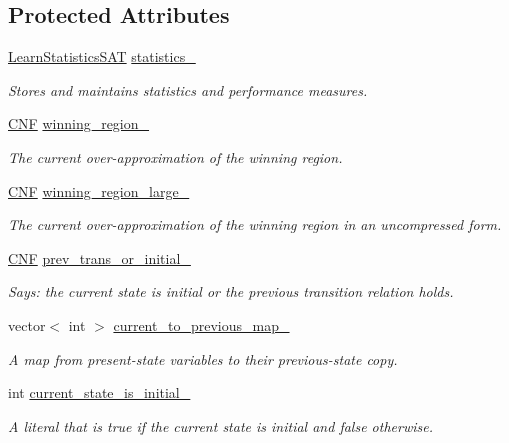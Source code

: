 \subsection*{Protected Attributes}
\begin{DoxyCompactItemize}
\item 
\hyperlink{classLearnStatisticsSAT}{Learn\-Statistics\-S\-A\-T} \hyperlink{classLearnSynthSAT_a2175c687276e00fa0fe3e158680affc1}{statistics\-\_\-}
\begin{DoxyCompactList}\small\item\em Stores and maintains statistics and performance measures. \end{DoxyCompactList}\item 
\hyperlink{classCNF}{C\-N\-F} \hyperlink{classLearnSynthSAT_aced2bce789c7a93ed4b5391dd0690616}{winning\-\_\-region\-\_\-}
\begin{DoxyCompactList}\small\item\em The current over-\/approximation of the winning region. \end{DoxyCompactList}\item 
\hyperlink{classCNF}{C\-N\-F} \hyperlink{classLearnSynthSAT_aaa79e8772e9ce8e59dc14e3bb1784256}{winning\-\_\-region\-\_\-large\-\_\-}
\begin{DoxyCompactList}\small\item\em The current over-\/approximation of the winning region in an uncompressed form. \end{DoxyCompactList}\item 
\hyperlink{classCNF}{C\-N\-F} \hyperlink{classLearnSynthSAT_a6289a4f041ca85ce44a33143fab42888}{prev\-\_\-trans\-\_\-or\-\_\-initial\-\_\-}
\begin{DoxyCompactList}\small\item\em Says\-: the current state is initial or the previous transition relation holds. \end{DoxyCompactList}\item 
vector$<$ int $>$ \hyperlink{classLearnSynthSAT_a98f676db61a949cd9c9626e165f378a4}{current\-\_\-to\-\_\-previous\-\_\-map\-\_\-}
\begin{DoxyCompactList}\small\item\em A map from present-\/state variables to their previous-\/state copy. \end{DoxyCompactList}\item 
int \hyperlink{classLearnSynthSAT_ace0511849ad0020364743f54dd75afee}{current\-\_\-state\-\_\-is\-\_\-initial\-\_\-}
\begin{DoxyCompactList}\small\item\em A literal that is true if the current state is initial and false otherwise. \end{DoxyCompactList}\item 

\end{DoxyCompactItemize}
